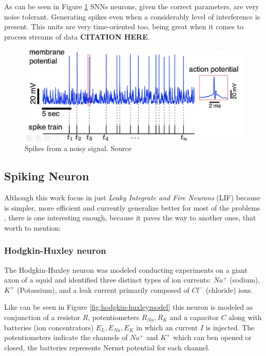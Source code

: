 		\par As can be seen in Figure \ref{fig:neuronspike} SNNs neurons, given the correct parameters, are very noise tolerant. Generating spikes even when a considerably level of interference is present. This units are very time-oriented too, being great when it comes to process streams of data \textbf{CITATION HERE}.
		
		\begin{figure}[H]
			\centering
			\includegraphics[width=.6\linewidth]{images/neuronSpikes}
			\caption{Spikes from a noisy signal. Source \cite{dan_goodman_2022_7044500}}
			\label{fig:neuronspike}
		\end{figure} 

	\subsection{Spiking Neuron}
		\par Although this work focus in just \textit{Leaky Integrate and Fire Neurons} (LIF) because is simpler, more efficient and currently generalize better for most of the problems \cite{dan_goodman_2022_7044500}, there is one interesting enough, because it paves the way to another ones, that worth to mention:
	
		\subsubsection{Hodgkin-Huxley neuron}
			\par The Hodgkin-Huxley neuron \cite{gerstner2014neuronal} was modeled conducting experiments on a giant axon of a squid and identified three distinct types of ion currents: $Na^+$ (sodium), $K^+$ (Potassium), and a leak current primarily composed of $Cl^-$ (chloride) ions.
			\par Like can be seen in Figure \ref{fig:hodgkin-huxleymodel} this neuron is modeled as conjunction of a resistor $R$, potentiometers $R_{Na}, R_{K}$ and a capacitor $C$ along with  batteries (ion concentrators) $E_L, E_{Na}, E_K$  in which an current $I$ is injected. The potentiometers indicate the channels of $Na^+$ and $K^+$ which can ben opened or closed, the batteries represents Nernst potential \cite{2023Gibbs} for each channel.
			
